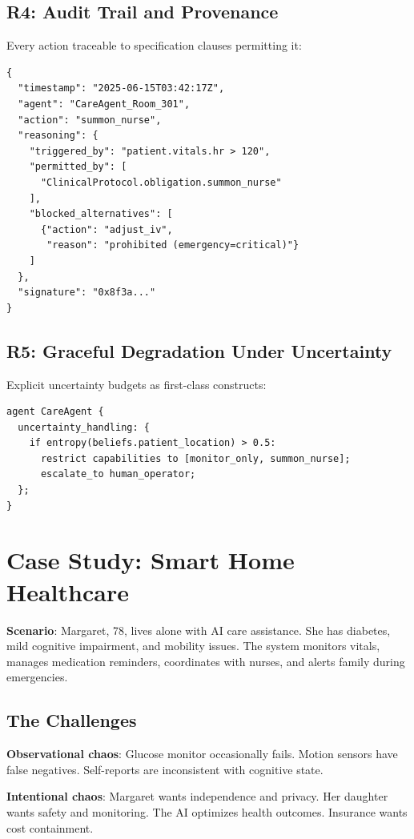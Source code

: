 \documentclass[conference]{IEEEtran}
\begin{document}
\subsection{R4: Audit Trail and Provenance}

Every action traceable to specification clauses permitting it:

\begin{lstlisting}
{
  "timestamp": "2025-06-15T03:42:17Z",
  "agent": "CareAgent_Room_301",
  "action": "summon_nurse",
  "reasoning": {
    "triggered_by": "patient.vitals.hr > 120",
    "permitted_by": [
      "ClinicalProtocol.obligation.summon_nurse"
    ],
    "blocked_alternatives": [
      {"action": "adjust_iv",
       "reason": "prohibited (emergency=critical)"}
    ]
  },
  "signature": "0x8f3a..."
}
\end{lstlisting}

\subsection{R5: Graceful Degradation Under Uncertainty}

Explicit uncertainty budgets as first-class constructs:

\begin{lstlisting}
agent CareAgent {
  uncertainty_handling: {
    if entropy(beliefs.patient_location) > 0.5:
      restrict capabilities to [monitor_only, summon_nurse];
      escalate_to human_operator;
  };
}
\end{lstlisting}

\section{Case Study: Smart Home Healthcare}
\label{sec:case-study}

\textbf{Scenario}: Margaret, 78, lives alone with AI care assistance.
She has diabetes, mild cognitive impairment, and mobility issues. The
system monitors vitals, manages medication reminders, coordinates with
nurses, and alerts family during emergencies.

\subsection{The Challenges}

\textbf{Observational chaos}: Glucose monitor occasionally fails. Motion
sensors have false negatives. Self-reports are inconsistent with
cognitive state.

\textbf{Intentional chaos}: Margaret wants independence and privacy. Her
daughter wants safety and monitoring. The AI optimizes health outcomes.
Insurance wants cost containment.
\end{document}
